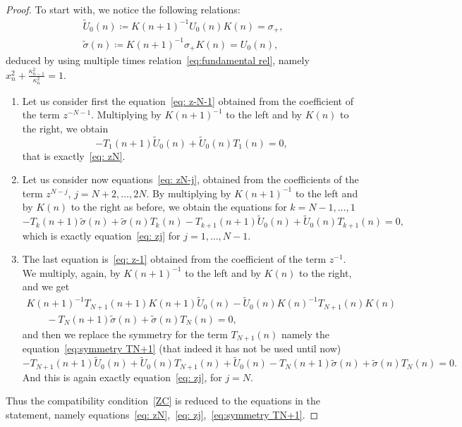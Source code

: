 \documentclass[pdftex]{sigma}%
\numberwithin{equation}{section}
\begin{document}
\begin{proof}
	To start with, we notice the following relations:
	\begin{gather*}
		\widetilde{U}_0(n)\coloneqq K(n+1)^{-1}U_0(n)K(n) = \sigma_+,
	\\
		\widetilde{\sigma}(n) \coloneqq K(n+1)^{-1}\sigma_+K(n)=U_0(n),
	\end{gather*}
	deduced by using multiple times relation~\eqref{eq:fundamental rel}, namely $x_n^2+\frac{\kappa_{n-1}^2}{\kappa_n^2}=1$.
	\begin{enumerate}\itemsep=0pt
		\item[1.] Let us consider first the equation~\eqref{eq: z-N-1} obtained from the coefficient of the term $z^{-N-1}$. Multiplying by $K(n+1)^{-1}$ to the left and by $K(n)$ to the right, we obtain
		\begin{equation*}
			-T_1(n+1)\widetilde{U}_0(n)+\widetilde{U}_0(n)T_1(n)=0,
		\end{equation*}
		that is exactly~\eqref{eq: zN}.
		
		\item[2.] Let us consider now equations~\eqref{eq: zN-j}, obtained from the coefficients of the term $z^{N-j}$, $j =N+2,\dots, 2N$. By multiplying by $K(n+1)^{-1}$ to the left and by $K(n)$ to the right as before, we obtain the equations for $k=N-1,\dots, 1$
		\begin{equation*} -T_k(n+1)\widetilde{\sigma}(n)+\widetilde{\sigma}(n)T_k(n)-T_{k+1}(n+1)\widetilde{U}_0(n) +\widetilde{U}_0(n)T_{k+1}(n)=0,
		\end{equation*}
		which is exactly equation~\eqref{eq: zj} for $j=1,\dots,N-1$.
		\item[3.] The last equation is~\eqref{eq: z-1} obtained from the coefficient of the term $z^{-1}$. We multiply, again, by $K(n+1)^{-1}$ to the left and by $K(n)$ to the right, and we get
		\begin{gather*} K(n+1)^{-1}T_{N+1}(n+1)K(n+1)\widetilde{U}_0(n)-\widetilde{U}_0(n)K(n)^{-1}T_{N+1}(n)K(n)
\\
\qquad{}-T_N(n+1)\widetilde{\sigma}(n)+\widetilde{\sigma}(n)T_N(n)=0,
		\end{gather*}
		and then we replace the symmetry for the term $T_{N+1}(n)$ namely the equation~\eqref{eq:symmetry TN+1} (that indeed it has not be used until now)
		\begin{equation*}
			-T_{N+1}(n+1)\widetilde{U}_0(n)+\widetilde{U}_0(n)T_{N+1}(n) + \widetilde{U}_0(n) -T_N(n+1)\widetilde{\sigma}(n)+\widetilde{\sigma}(n)T_N(n)=0.
		\end{equation*}
		And this is again exactly equation~\eqref{eq: zj}, for $j=N$.
	\end{enumerate}
Thus the compatibility condition~\eqref{ZC} is reduced to the equations in the statement, namely equations~\eqref{eq: zN},~\eqref{eq: zj},~\eqref{eq:symmetry TN+1}.
\end{proof}
\end{document}
